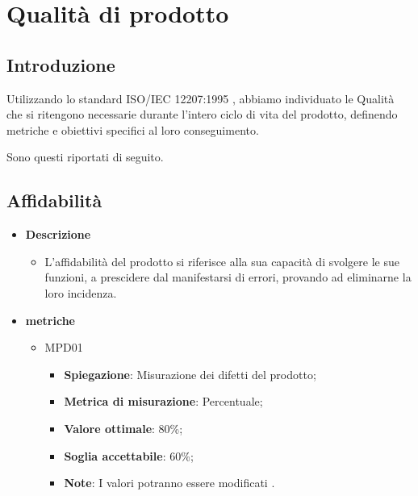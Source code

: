 \chapter{Qualità di prodotto}\label{qualita-di-prodotto}

\section{Introduzione}
Utilizzando lo standard ISO/IEC 12207:1995 , abbiamo individuato le Qualità che si ritengono necessarie durante l'intero ciclo di vita del prodotto, definendo metriche e obiettivi specifici al loro conseguimento.

Sono questi riportati di seguito.

\section{Affidabilità}
\begin{itemize}
    \item \textbf{Descrizione}
    \begin{itemize}
        \item L'affidabilità del prodotto si riferisce alla sua capacità di svolgere le sue funzioni, a prescidere dal manifestarsi di errori, provando ad eliminarne la loro incidenza.
    \end{itemize}
    
    \item \textbf{metriche}
    \begin{itemize}
        \item MPD01
        \begin{itemize}
            \item \textbf{Spiegazione}: Misurazione dei difetti del prodotto;
        \item \textbf{Metrica di misurazione}: Percentuale;
        \item \textbf{Valore ottimale}: 80\%;
        \item \textbf{Soglia accettabile}: 60\%;
        \item \textbf{Note}: I valori potranno essere modificati .
        \end{itemize}
    \end{itemize}
    \end{itemize}

